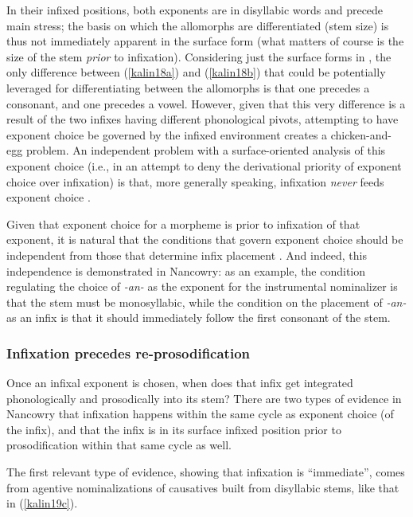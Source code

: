 \documentclass[output=paper]{langscibook}
\begin{document}
\noindent In their infixed positions, both exponents are in disyllabic words and precede main stress; the basis on which the allomorphs are differentiated (stem size) is thus not immediately apparent in the surface form (what matters of course is the size of the stem \textit{prior} to infixation). Considering just the surface forms in \Last, the only difference between (\ref{kalin18a}) and (\ref{kalin18b}) that could be potentially leveraged for differentiating between the allomorphs is that one precedes a consonant, and one precedes a vowel. However, given that this very difference is a result of the two infixes having different phonological pivots, attempting to have exponent choice be governed by the infixed environment creates a chicken-and-egg problem. An independent problem with a surface-oriented analysis of this exponent choice (i.e., in an attempt to deny the derivational priority of exponent choice over infixation) is that, more  generally speaking, infixation \textit{never} feeds exponent choice \citep{KalinIP}.  

Given that exponent choice for a morpheme is prior to infixation of that exponent, it is natural that the conditions that govern exponent choice should be independent from those that determine infix placement  \citep{KalinRolle21}. And indeed, this independence is demonstrated in Nancowry: as an example, the condition regulating the choice of \textit{-an-} as the exponent for the instrumental nominalizer is that the stem must be monosyllabic, while the condition on the placement of \textit{-an-} as an infix is that it should immediately follow the first consonant of the stem.

\subsubsection{Infixation precedes re-prosodification}\label{kalininford}\label{sec:kalin:4.2.2}

Once an infixal exponent is chosen, when does that infix get integrated phonologically and prosodically into its stem? There are two types of evidence in Nancowry that infixation happens within the same cycle as exponent choice (of the infix), and that the infix is in its surface infixed position prior to prosodification within that same cycle as well. 

The first relevant type of evidence, showing that infixation is ``immediate'', comes from agentive nominalizations of causatives built from disyllabic stems, like that in (\ref{kalin19c}).
\end{document}
